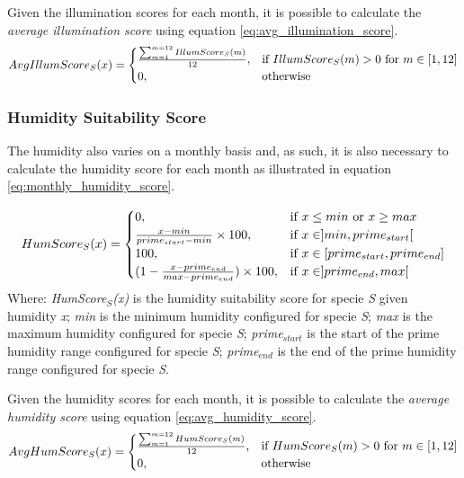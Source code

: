 Given the illumination scores for each month, it is possible to calculate the \textit{average illumination score} using equation \ref{eq:avg_illumination_score}.
\begin{equation}
\centering
AvgIllumScore_{S}(x) =
\begin{cases}
	\frac{\sum_{m=1}^{m=12} IllumScore_{S}(m)}{12}, & \text{if } IllumScore_{S}(m) > 0 \text{ for } m \in [1,12] \\
    0,              & \text{otherwise}
\end{cases}
\label{eq:avg_illumination_score}
\end{equation}

\subsubsection{Humidity Suitability Score}

The humidity also varies on a monthly basis and, as such, it is also necessary to calculate the humidity score for each month as illustrated in equation \ref{eq:monthly_humidity_score}.

\begin{equation}
\centering
HumScore_{S}(x) = 
\begin{cases}
    0, & \text{if } x \leq min \text{ or } x \geq max \\
    \frac{x - min}{prime_{start} - min} \times 100, & \text{if } x \in ]min,prime_{start}[ \\
    100, & \text{if } x \in [prime_{start},prime_{end}] \\
    (1 - \frac{x - prime_{end}}{max-prime_{end}}) \times 100, & \text{if } x \in ]prime_{end},max[ \\
\end{cases}
\label{eq:monthly_humidity_score}
\end{equation}
Where: \textit{HumScore$_{S}$(x)} is the humidity suitability score for specie \textit{S} given humidity \textit{x}; \textit{min} is the minimum humidity configured for specie \textit{S}; \textit{max} is the maximum humidity configured for specie \textit{S}; \textit{prime$_{start}$} is the start of the prime humidity range configured for specie \textit{S}; \textit{prime$_{end}$} is the end of the prime humidity range configured for specie \textit{S}.

Given the humidity scores for each month, it is possible to calculate the \textit{average humidity score} using equation \ref{eq:avg_humidity_score}. 
\begin{equation}
\centering
AvgHumScore_{S}(x) =
\begin{cases}
	\frac{\sum_{m=1}^{m=12} HumScore_{S}(m)}{12}, & \text{if } HumScore_{S}(m) > 0 \text{ for } m \in [1,12] \\
    0,              & \text{otherwise}
\end{cases}
\label{eq:avg_humidity_score}
\end{equation}

